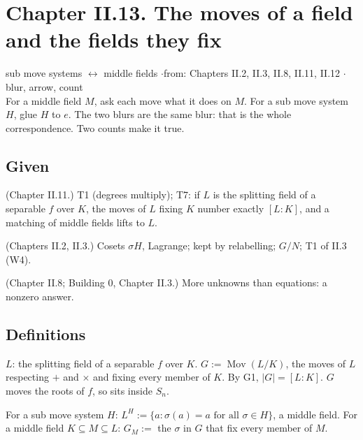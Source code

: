 \newpage

\section*{Chapter II.13. The moves of a field and the fields they fix}
\begin{center}
{\normalsize sub move systems $\leftrightarrow$ middle fields \quad$\cdot$\quad from: Chapters II.2, II.3, II.8, II.11, II.12 \quad$\cdot$\quad blur, arrow, count}\\[4pt]
{\small For a middle field $M$, ask each move what it does on $M$. For a sub move system $H$, glue $H$ to $e$. The two blurs are the same blur: that is the whole correspondence. Two counts make it true.}
\end{center}

\subsection*{Given}

\begin{lines}
\item[\lab{G1}] (Chapter II.11.) T1 (degrees multiply); T7: if $L$ is the splitting field of a separable $f$ over $K$, the moves of $L$ fixing $K$ number exactly $[L : K]$, and a matching of middle fields lifts to $L$.
\item[\lab{G2}] (Chapters II.2, II.3.) Cosets $\sigma H$, Lagrange; kept by relabelling; $G/N$; T1 of II.3 (W4).
\item[\lab{G3}] (Chapter II.8; Building 0, Chapter II.3.) More unknowns than equations: a nonzero answer.
\end{lines}

\subsection*{Definitions}

\begin{lines}
\item[\lab{D1}] $L$: the splitting field of a separable $f$ over $K$. $G := \operatorname{Mov}(L/K)$, the moves of $L$ respecting $+$ and $\times$ and fixing every member of $K$. By G1, $|G| = [L : K]$. $G$ moves the roots of $f$, so sits inside $S_n$.
\item[\lab{D2}] For a sub move system $H$: $L^H := \{ a : \sigma(a) = a \text{ for all } \sigma \in H \}$, a middle field. For a middle field $K \subseteq M \subseteq L$: $G_M :=$ the $\sigma$ in $G$ that fix every member of $M$.
\end{lines}

